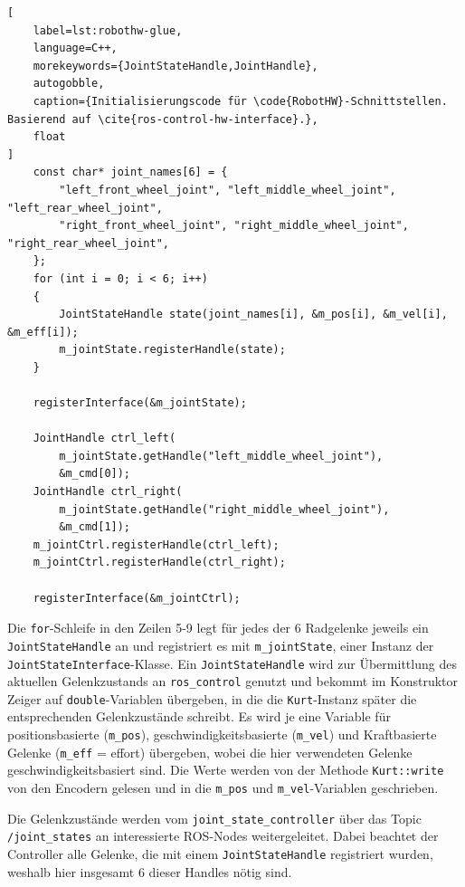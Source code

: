 \documentclass[german]{thesis_KBS}
\newcommand{\code}[1]{\texttt{#1}}  %
\begin{document}
\begin{lstlisting}[
    label=lst:robothw-glue,
    language=C++,
    morekeywords={JointStateHandle,JointHandle},
    autogobble,
    caption={Initialisierungscode für \code{RobotHW}-Schnittstellen. Basierend auf \cite{ros-control-hw-interface}.},
    float
]
    const char* joint_names[6] = {
        "left_front_wheel_joint", "left_middle_wheel_joint", "left_rear_wheel_joint",
        "right_front_wheel_joint", "right_middle_wheel_joint", "right_rear_wheel_joint",
    };
    for (int i = 0; i < 6; i++)
    {
        JointStateHandle state(joint_names[i], &m_pos[i], &m_vel[i], &m_eff[i]);
        m_jointState.registerHandle(state);
    }

    registerInterface(&m_jointState);

    JointHandle ctrl_left(
        m_jointState.getHandle("left_middle_wheel_joint"),
        &m_cmd[0]);
    JointHandle ctrl_right(
        m_jointState.getHandle("right_middle_wheel_joint"),
        &m_cmd[1]);
    m_jointCtrl.registerHandle(ctrl_left);
    m_jointCtrl.registerHandle(ctrl_right);

    registerInterface(&m_jointCtrl);
\end{lstlisting}

Die \code{for}-Schleife in den Zeilen 5-9 legt für jedes der 6 Radgelenke
jeweils ein \code{JointStateHandle} an und registriert es mit
\code{m\_jointState}, einer Instanz der \code{JointStateInterface}-Klasse. Ein
\code{JointStateHandle} wird zur Übermittlung des aktuellen Gelenkzustands an
\code{ros\_control} genutzt und bekommt im Konstruktor Zeiger auf
\code{double}-Variablen übergeben, in die die \code{Kurt}-Instanz später die
entsprechenden Gelenkzustände schreibt. Es wird je eine Variable für
positionsbasierte (\code{m\_pos}), geschwindigkeitsbasierte (\code{m\_vel}) und
Kraftbasierte Gelenke (\code{m\_eff} = effort) übergeben, wobei die hier
verwendeten Gelenke geschwindigkeitsbasiert sind. Die Werte werden von der
Methode \code{Kurt::write} von den Encodern gelesen und in die \code{m\_pos} und
\code{m\_vel}-Variablen geschrieben.

Die Gelenkzustände werden vom \code{joint\_state\_controller} über das Topic
\code{/joint\_states} an interessierte ROS-Nodes weitergeleitet. Dabei beachtet
der Controller alle Gelenke, die mit einem \code{JointStateHandle} registriert
wurden, weshalb hier insgesamt 6 dieser Handles nötig sind.
\end{document}
